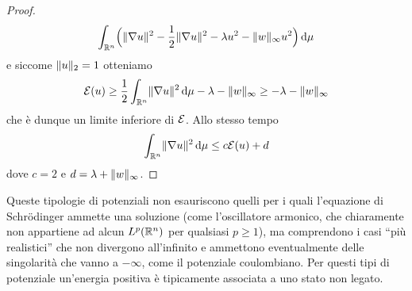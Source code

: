 \begin{proof}
\begin{equation}
\begin{split}
            \int_{\R^n}\Bigl(\norm{\grad u}^2-\frac12\norm{\grad u}^2-\lambda u^2-\norm{w}_\infty u^2\Bigr)\,\dd\mu
        \end{split}
    \end{equation}
    e siccome $\norm{u}_2=1$ otteniamo
    \begin{equation}
        \E(u)\ge
        \frac12\int_{\R^n}\norm{\grad u}^2\,\dd\mu-\lambda-\norm{w}_\infty\ge
        -\lambda-\norm{w}_\infty
    \end{equation}
    che è dunque un limite inferiore di $\E$.
    Allo stesso tempo
    \begin{equation}
        \int_{\R^n}\norm{\grad u}^2\,\dd\mu\le
        c\E(u)+d
    \end{equation}
    dove $c=2$ e $d=\lambda+\norm{w}_\infty$.
\end{proof}
\begin{osservazione} \label{o:potenziali-ammissibili}
    Queste tipologie di potenziali non esauriscono quelli per i quali l'equazione di Schrödinger ammette una soluzione (come l'oscillatore armonico, che chiaramente non appartiene ad alcun $\leb[p]{\R^n}$ per qualsiasi $p\ge 1$), ma comprendono i casi ``più realistici'' che non divergono all'infinito e ammettono eventualmente delle singolarità che vanno a $-\infty$, come il potenziale coulombiano.
    Per questi tipi di potenziale un'energia positiva è tipicamente associata a uno stato non legato.
\end{osservazione}

